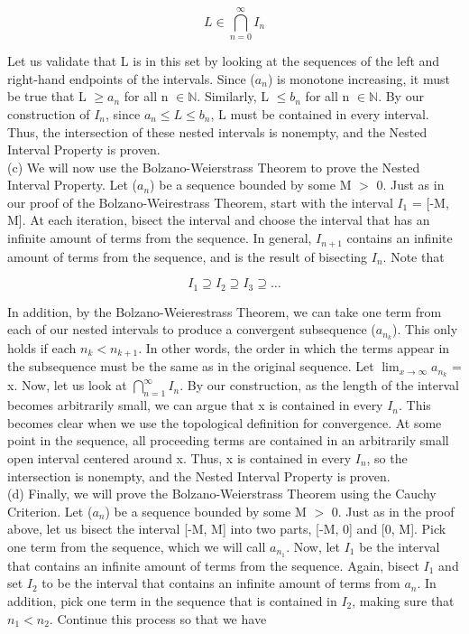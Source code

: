 \documentclass{article}
\begin{document}
\begin{equation}
    L \in \bigcap^\infty_{n=0} I_n 
\end{equation}

Let us validate that L is in this set by looking at the sequences of the left and right-hand endpoints of the intervals. Since ($a_n$) is monotone increasing, it must be true that L $\geq a_n$ for all n $\in \mathbb{N}$. Similarly, L $\leq b_n$ for all n $\in \mathbb{N}$. By our construction of $I_n$, since $a_n \leq L \leq b_n$, L must be contained in every interval. Thus, the intersection of these nested intervals is nonempty, and the Nested Interval Property is proven. \\

(c) We will now use the Bolzano-Weierstrass Theorem to prove the Nested Interval Property. Let ($a_n$) be a sequence bounded by some M $>$ 0. Just as in our proof of the Bolzano-Weirestrass Theorem, start with the interval $I_1$ = [-M, M]. At each iteration, bisect the interval and choose the interval that has an infinite amount of terms from the sequence. In general, $I_{n+1}$ contains an infinite amount of terms from the sequence, and is the result of bisecting $I_n$. Note that 

\begin{equation}
    I_1 \supseteq I_2 \supseteq I_3 \supseteq \ldots
\end{equation}

In addition, by the Bolzano-Weierestrass Theorem, we can take one term from each of our nested intervals to produce a convergent subsequence ($a_{n_k}$). This only holds if each $n_k < n_{k+1}$. In other words, the order in which the terms appear in the subsequence must be the same as in the original sequence. Let $\lim_{x \to \infty} a_{n_k}$ = x. Now, let us look at ${\bigcap}_{n=1}^\infty$$I_n$. By our construction, as the length of the interval becomes arbitrarily small, we can argue that x is contained in every $I_n$. This becomes clear when we use the topological definition for convergence. At some point in the sequence, all proceeding terms are contained in an arbitrarily small open interval centered around x. Thus, x is contained in every $I_n$, so the intersection is nonempty, and the Nested Interval Property is proven. \\

(d) Finally, we will prove the Bolzano-Weierstrass Theorem using the Cauchy Criterion. Let ($a_n$) be a sequence bounded by some M $>$ 0. Just as in the proof above, let us bisect the interval [-M, M] into two parts, [-M, 0] and [0, M].  Pick one term from the sequence, which we will call $a_{n_1}$. Now, let $I_1$ be the interval that contains an infinite amount of terms from the sequence. Again, bisect $I_1$ and set $I_2$ to be the interval that contains an infinite amount of terms from $a_n$. In addition, pick one term in the sequence that is contained in $I_2$, making sure that $n_1 < n_2$. Continue this process so that we have 
\end{document}
